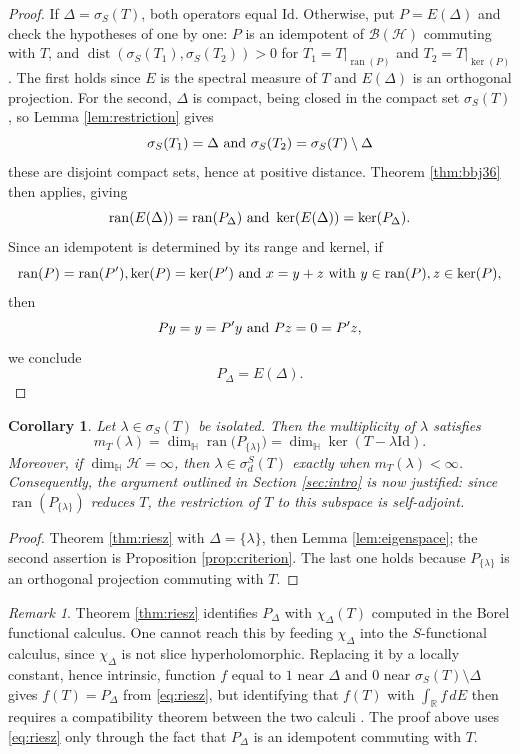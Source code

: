 \documentclass[12pt,a4paper]{article}
\theoremstyle{plain}
\newtheorem{corollary}[theorem]{Corollary}
\theoremstyle{definition}
\theoremstyle{remark}
\newtheorem{remark}[theorem]{Remark}
\newcommand{\HH}{\mathbb H}
\newcommand{\RR}{\mathbb R}
\newcommand{\BB}{\mathcal B}
\newcommand{\Id}{\mathrm{Id}}
\newcommand{\HS}{\mathcal H}
\newcommand{\dimH}{\dim_{\HH}}
\newcommand{\sigS}{\sigma_S}
\newcommand{\sigdS}{\sigma_{d}^{S}}
\DeclareMathOperator{\ran}{ran}
\DeclareMathOperator{\dist}{dist}
\begin{document}
{\begin{proof}
If $\Delta=\sigS(T)$, both operators equal $\Id$. Otherwise, put
$P=E(\Delta)$ and check the hypotheses of
\cite[Theorem 3.6]{BaloudiBelgacemJeribi2022} one by one: $P$ is an
idempotent of $\BB(\HS)$ commuting with $T$, and
$\dist(\sigS(T_1),\sigS(T_2))>0$ for $T_1=T|_{\ran(P)}$ and
$T_2=T|_{\ker(P)}$. The first holds since $E$ is the spectral measure
of $T$ and $E(\Delta)$ is an orthogonal projection. For the second,
$\Delta$ is compact, being closed in the compact set $\sigS(T)$, so
Lemma \ref{lem:restriction} gives $$\sigS(T_1)=\Delta \hbox{ and }
\sigS(T_2)=\sigS(T)\setminus\Delta$$ these are disjoint compact sets,
hence at positive distance. Theorem \ref{thm:bbj36} then applies,
giving $$\ran(E(\Delta))=\ran(P_\Delta) \hbox{ and }
\ker(E(\Delta))=\ker(P_\Delta).$$ Since an idempotent is determined by
its range and kernel, if $$\ran(P)=\ran(P'),
\ker(P)=\ker(P') \hbox{ and } x=y+z \hbox{ with }  y\in\ran(P), z\in\ker(P),$$ then
$$Py=y=P'y \hbox{ and } Pz=0=P'z,$$ we conclude $$P_\Delta=E(\Delta).$$
\end{proof}
  
\begin{corollary}
\label{cor:multiplicity}
Let $\lambda\in\sigS(T)$ be isolated. Then the multiplicity of
$\lambda$ satisfies
\[
 m_T(\lambda)=\dimH\ran\big(P_{\{\lambda\}}\big)
 =\dimH\ker(T-\lambda\Id).
\]
Moreover, if $\dimH\HS=\infty$, then $\lambda\in\sigdS(T)$ exactly when
$m_T(\lambda)<\infty$. Consequently, the argument outlined in Section
\ref{sec:intro} is now justified: since
$\ran(P_{\{\lambda\}})$ reduces $T$, the restriction of $T$ to this
subspace is self-adjoint.
\end{corollary}
\begin{proof}
Theorem \ref{thm:riesz} with $\Delta=\{\lambda\}$, then Lemma
\ref{lem:eigenspace}; the second assertion is Proposition
\ref{prop:criterion}. The last one holds because $P_{\{\lambda\}}$ is
an orthogonal projection commuting with $T$.
\end{proof}

\begin{remark}
\label{rem:chi}
Theorem \ref{thm:riesz} identifies $P_\Delta$ with $\chi_\Delta(T)$
computed in the Borel functional calculus. One cannot reach this by
feeding $\chi_\Delta$ into the $S$-functional calculus, since
$\chi_\Delta$ is not slice hyperholomorphic. Replacing it by a locally
constant, hence intrinsic, function $f$ equal to $1$ near $\Delta$ and
$0$ near $\sigS(T)\setminus\Delta$ gives $f(T)=P_\Delta$ from
\eqref{eq:riesz}, but identifying that $f(T)$ with $\int_\RR f\,dE$
then requires a compatibility theorem between the two calculi
\cite{ColomboGantnerKimsey2018}. The proof above uses
\eqref{eq:riesz} only through the fact that $P_\Delta$ is an
idempotent commuting with $T$.
\end{remark}

}
\end{document}
